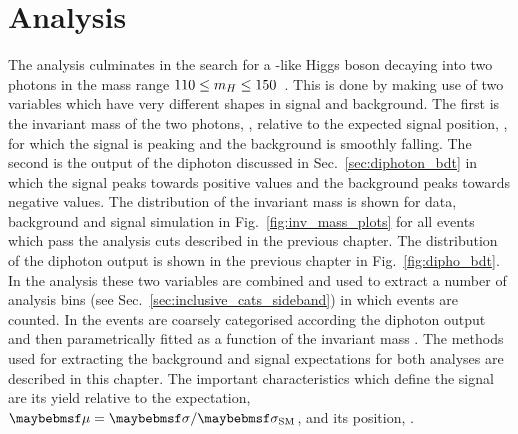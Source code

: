 \chapter{Analysis}
\label{chap:analysis}

The analysis culminates in the search for a \SM-like Higgs boson decaying into two photons in the mass range $110\leq m_{H}\leq 150$~\GeV. This is done by making use of two variables which have very different shapes in signal and background. The first is the invariant mass of the two photons, \mgg, relative to the expected signal position, \mH, for which the signal is peaking and the background is smoothly falling. The second is the output of the diphoton \BDT discussed in Sec.~\ref{sec:diphoton_bdt} in which the signal peaks towards positive values and the background peaks towards negative values. The distribution of the invariant mass is shown for data, background and signal \MC simulation in Fig.~\ref{fig:inv_mass_plots} for all events which pass the analysis cuts described in the previous chapter. The distribution of the diphoton \BDT output is shown in the previous chapter in Fig.~\ref{fig:dipho_bdt}. In the \SMVA analysis these two variables are combined and used to extract a number of analysis bins (see Sec.~\ref{sec:inclusive_cats_sideband}) in which events are counted. In the \MFM events are coarsely categorised according the diphoton \BDT output and then parametrically fitted as a function of the invariant mass \mgg. The methods used for extracting the background and signal expectations for both analyses are described in this chapter. The important characteristics which define the signal are its yield relative to the \SM expectation, $\mu=\musm$, and its position, \mH.

